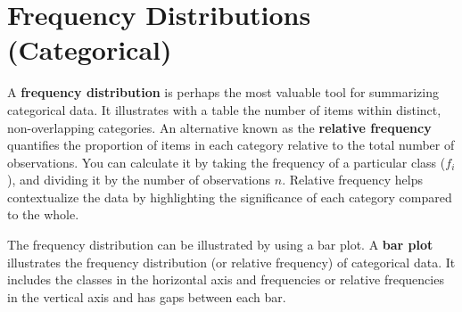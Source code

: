 \documentclass[
  11pt,
  letterpaper,
  DIV=11,
  numbers=noendperiod,
  oneside,
  open=any]{scrreprt}
\begin{document}
\section{Frequency Distributions
(Categorical)}\label{frequency-distributions-categorical}

A \textbf{frequency distribution} is perhaps the most valuable tool for
summarizing categorical data. It illustrates with a table the number of
items within distinct, non-overlapping categories. An alternative known
as the \textbf{relative frequency} quantifies the proportion of items in
each category relative to the total number of observations. You can
calculate it by taking the frequency of a particular class (\(f_{i}\)),
and dividing it by the number of observations \(n\). Relative frequency
helps contextualize the data by highlighting the significance of each
category compared to the whole.

The frequency distribution can be illustrated by using a bar plot. A
\textbf{bar plot} illustrates the frequency distribution (or relative
frequency) of categorical data. It includes the classes in the
horizontal axis and frequencies or relative frequencies in the vertical
axis and has gaps between each bar.
\end{document}
